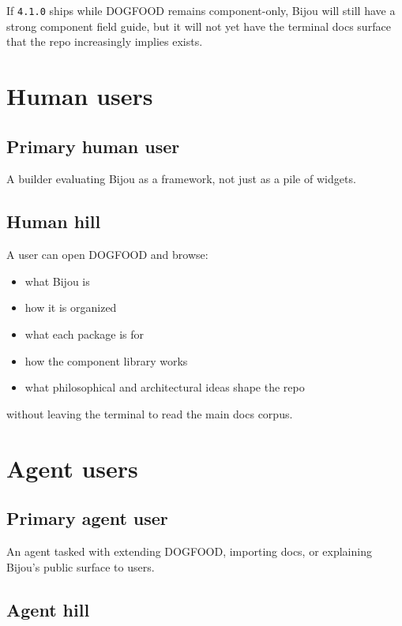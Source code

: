 If \texttt{4\allowbreak{}.\allowbreak{}1\allowbreak{}.\allowbreak{}0} ships while DOGFOOD remains component-only, Bijou will still have a strong component field guide, but it will not yet have the terminal docs surface that the repo increasingly implies exists.

\section{Human users}\label{record-082-human-users}

\subsection{Primary human user}\label{record-082-primary-human-user}

A builder evaluating Bijou as a framework, not just as a pile of widgets.

\subsection{Human hill}\label{record-082-human-hill}

A user can open DOGFOOD and browse:

\begin{itemize}
\tightlist
\item
  what Bijou is
\item
  how it is organized
\item
  what each package is for
\item
  how the component library works
\item
  what philosophical and architectural ideas shape the repo
\end{itemize}

without leaving the terminal to read the main docs corpus.

\section{Agent users}\label{record-082-agent-users}

\subsection{Primary agent user}\label{record-082-primary-agent-user}

An agent tasked with extending DOGFOOD, importing docs, or explaining Bijou's public surface to users.

\subsection{Agent hill}\label{record-082-agent-hill}

